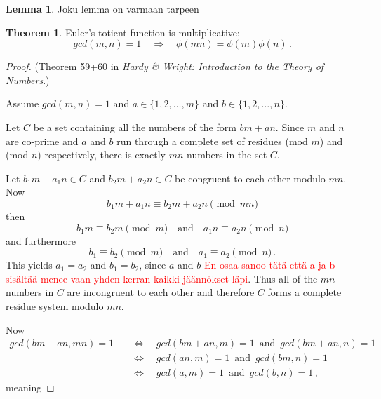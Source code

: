 \documentclass{article}
\theoremstyle{definition}
\newtheorem{lemma}[subsubsection]{Lemma}
\newtheorem{theorem}[subsection]{Theorem}
\begin{document}
\begin{lemma}
Joku lemma on varmaan tarpeen
\end{lemma}

\begin{theorem}
Euler's totient function is multiplicative:
\begin{equation*}
    gcd(m,n)=1 \quad\Rightarrow\quad \phi(mn)=\phi(m)\phi(n)\,.
\end{equation*}

\begin{proof}

(Theorem 59+60 in \textit{Hardy \& Wright: Introduction to the Theory of Numbers}.)

Assume $gcd(m,n)=1$ and $a\in\{1,2,\dots,m\}$ and $b\in\{1,2,\dots,n\}$.


Let $C$ be a set containing all the numbers of the form $bm+an$. Since $m$ and $n$ are co-prime and $a$ and $b$ run through a complete set of residues (mod $m$) and (mod $n$) respectively, there is exactly $mn$ numbers in the set $C$.

Let $b_1m+a_1n \in C$ and $b_2m+a_2n \in C$ be congruent to each other modulo $mn$. Now
\begin{equation*}
    b_1m+a_1n \equiv b_2m+a_2n \pmod{mn}
\end{equation*}
then
\begin{equation*}
    b_1m \equiv b_2m \pmod{m} \quad \text{and} \quad a_1n \equiv a_2n \pmod{n}
\end{equation*}
and furthermore
\begin{equation*}
    b_1 \equiv b_2 \pmod{m} \quad \text{and} \quad a_1 \equiv a_2 \pmod{n}\,.
\end{equation*}
This yields $a_1 = a_2$ and $b_1 = b_2$, since $a$ and $b$ \textcolor{red}{En osaa sanoo tätä että a ja b sisältää menee vaan yhden kerran kaikki jäännökset läpi}.
Thus all of the $mn$ numbers in $C$ are incongruent to each other and therefore $C$ forms a complete residue system modulo $mn$.

Now
\begin{align*}
    gcd(bm+an,mn)=1 \quad & \Leftrightarrow \quad gcd(bm+an,m)=1\, \text{ and } \,gcd(bm+an,n)=1\\
    & \Leftrightarrow \quad gcd(an,m)=1\, \text{ and } \,gcd(bm,n)=1\\
    & \Leftrightarrow \quad gcd(a,m)=1\, \text{ and } \,gcd(b,n)=1\,,
\end{align*}
meaning 

\end{proof}

\end{theorem}
\end{document}
